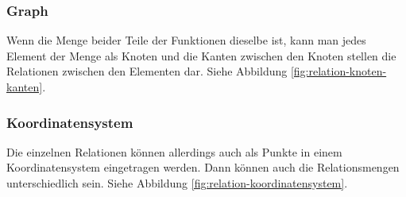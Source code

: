 \subsubsection{Graph}
Wenn die Menge beider Teile der Funktionen dieselbe ist, kann man jedes Element der Menge als Knoten und die Kanten zwischen den Knoten stellen die Relationen zwischen den Elementen dar. Siehe Abbildung \ref{fig:relation-knoten-kanten}.

\subsubsection{Koordinatensystem}
Die einzelnen Relationen können allerdings auch als Punkte in einem Koordinatensystem eingetragen werden. Dann können auch die Relationsmengen unterschiedlich sein. Siehe Abbildung \ref{fig:relation-koordinatensystem}.

